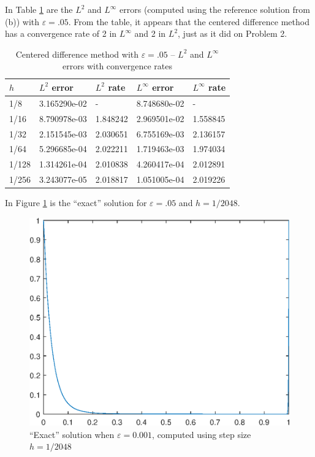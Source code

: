 \documentclass{homework}
\begin{document}
\begin{alphaparts}
		\questionpart In Table \ref{tab:p3c} are the $L^2$ and $L^\infty$ errors (computed using the reference solution from (b)) with $\varepsilon = .05$. From the table, it appears that the centered difference method has a convergence rate of 2 in $L^\infty$ and 2 in $L^2$, just as it did on Problem 2.
		
		\begin{table}[h]
			\centering
			\begin{tabular}{@{}lllll@{}}
				\toprule
				$h$ & $L^2$ error & $L^2$ rate & $L^\infty$ error & $L^\infty$ rate \\
				\midrule
				1/8 & 3.165290e-02 & - & 8.748680e-02 & -\\
				1/16 & 8.790978e-03 & 1.848242 & 2.969501e-02 & 1.558845\\
				1/32 & 2.151545e-03 & 2.030651 & 6.755169e-03 & 2.136157\\
				1/64 & 5.296685e-04 & 2.022211 & 1.719463e-03 & 1.974034\\
				1/128 & 1.314261e-04 & 2.010838 & 4.260417e-04 & 2.012891\\
				1/256 & 3.243077e-05 & 2.018817 & 1.051005e-04 & 2.019226\\
				\bottomrule
			\end{tabular}
			\caption{Centered difference method with $\varepsilon = .05$ -- $L^2$ and $L^\infty$ errors with convergence rates}
			\label{tab:p3c}
		\end{table}
		
		\questionpart In Figure \ref{fig:p3d} is the ``exact'' solution for $\varepsilon = .05$ and $h = 1/2048$.
		
		\begin{figure}
			\centering
			\includegraphics{p3d.eps}
			\caption{``Exact'' solution when $\varepsilon = 0.001$, computed using step size $h = 1/2048$}
			\label{fig:p3d}
		\end{figure}
		

\end{alphaparts}
\end{document}
